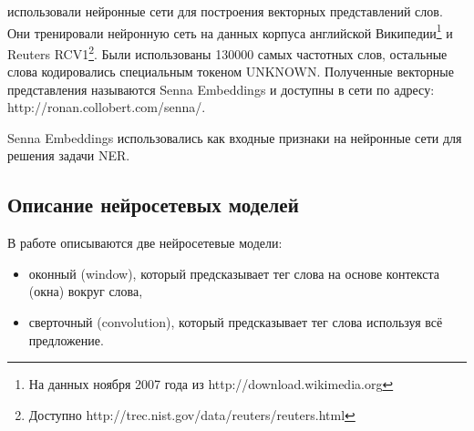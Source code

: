   \citep{collobert2011natural} использовали нейронные сети для построения векторных представлений слов.
  Они тренировали нейронную сеть на данных корпуса английской
  Википедии\footnote{На данных ноября 2007 года из http://download.wikimedia.org}
  и Reuters RCV1\footnote{Доступно http://trec.nist.gov/data/reuters/reuters.html}.
  Были использованы 130000 самых частотных слов, остальные слова кодировались
  специальным токеном UNKNOWN.
  Полученные векторные представления называются Senna Embeddings и доступны в сети
  по адресу: http://ronan.collobert.com/senna/.

  Senna Embeddings использовались как входные признаки на нейронные сети для решения задачи NER.

  \subsection{Описание нейросетевых моделей} \label{subsection:nn}

  В работе \citep{collobert2011natural} описываются две нейросетевые модели:
  \begin{itemize}
  \item оконный (window), который предсказывает тег слова на основе контекста (окна) вокруг слова,
  \item сверточный (convolution), который предсказывает тег слова используя всё предложение.
  \end{itemize}

